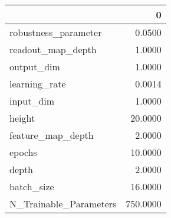 \begin{tabular}{lr}
\toprule
{} &         0 \\
\midrule
robustness\_parameter   &    0.0500 \\
readout\_map\_depth      &    1.0000 \\
output\_dim             &    1.0000 \\
learning\_rate          &    0.0014 \\
input\_dim              &    1.0000 \\
height                 &   20.0000 \\
feature\_map\_depth      &    2.0000 \\
epochs                 &   10.0000 \\
depth                  &    2.0000 \\
batch\_size             &   16.0000 \\
N\_Trainable\_Parameters &  750.0000 \\
\bottomrule
\end{tabular}
